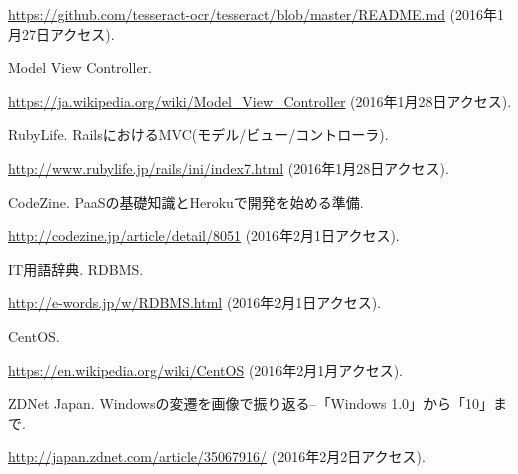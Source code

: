 \begin{thebibliography}{99}
\url{https://github.com/tesseract-ocr/tesseract/blob/master/README.md}
(2016年1月27日アクセス).

Model View Controller.

\url{https://ja.wikipedia.org/wiki/Model_View_Controller}
(2016年1月28日アクセス).

RubyLife. RailsにおけるMVC(モデル/ビュー/コントローラ).

\url{http://www.rubylife.jp/rails/ini/index7.html}
(2016年1月28日アクセス).

CodeZine. PaaSの基礎知識とHerokuで開発を始める準備.

\url{http://codezine.jp/article/detail/8051}
(2016年2月1日アクセス).

IT用語辞典. RDBMS.

\url{http://e-words.jp/w/RDBMS.html}
(2016年2月1日アクセス).

CentOS.

\url{https://en.wikipedia.org/wiki/CentOS}
(2016年2月1月アクセス).


ZDNet Japan. Windowsの変遷を画像で振り返る--「Windows 1.0」から「10」まで.

\url{http://japan.zdnet.com/article/35067916/}
(2016年2月2日アクセス).

\end{thebibliography}